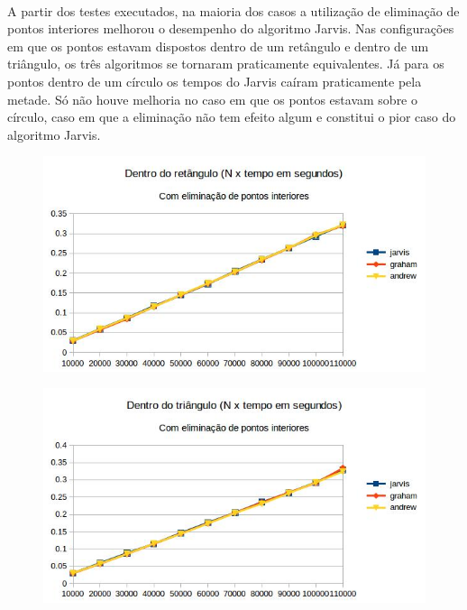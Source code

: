 \documentclass[11pt,a4paper]{article}
\begin{document}
    \paragraph{}
    A partir dos testes executados, na maioria dos casos a utilização de eliminação de pontos interiores melhorou o desempenho do algoritmo Jarvis. Nas configurações em que os pontos estavam dispostos dentro de um retângulo e dentro de um triângulo, os três algoritmos se tornaram praticamente equivalentes. Já para os pontos dentro de um círculo os tempos do Jarvis caíram praticamente pela metade. Só não houve melhoria no caso em que os pontos estavam sobre o círculo, caso em que a eliminação não tem efeito algum e constitui o pior caso do algoritmo Jarvis.

        \begin{figure}[!htb]
                \captionsetup{justification=centering,margin=2cm}
            \centering
              \begin{minipage}[b]{.8\textwidth}
              \centering
                  \includegraphics[width=\linewidth]{graph_retangulo_yes}
                  \label{fig:map}
                \end{minipage}
              \begin{minipage}[b]{.8\textwidth}
              \centering
                  \includegraphics[width=\linewidth]{graph_triangulo_yes}
                  \label{fig:map}
                \end{minipage}
                \caption{}
            \end{figure}
\end{document}
